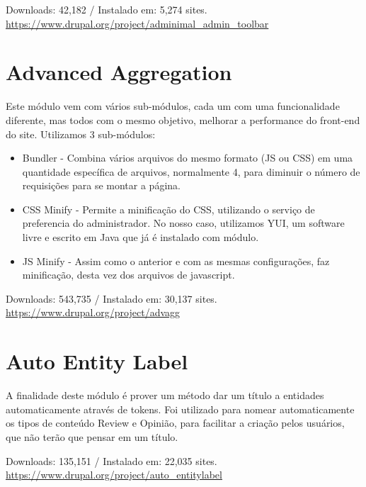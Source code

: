 \begin{center}
  Downloads: 42,182 / Instalado em: 5,274 sites.
  \url{https://www.drupal.org/project/adminimal_admin_toolbar}
\end{center}

\section{Advanced Aggregation}
Este módulo vem com vários sub-módulos, cada um com uma funcionalidade diferente, mas todos com o mesmo objetivo, melhorar a performance do front-end do site. Utilizamos 3 sub-módulos:

\begin{itemize}
  \item Bundler - Combina vários arquivos do mesmo formato (JS ou CSS) em uma quantidade específica de arquivos, normalmente 4, para diminuir o número de requisições para se montar a página.
  \item CSS Minify - Permite a minificação do CSS, utilizando o serviço de preferencia do administrador. No nosso caso, utilizamos YUI, um software livre e escrito em Java que já é instalado com módulo.
  \item JS Minify - Assim como o anterior e com as mesmas configurações, faz minificação, desta vez dos arquivos de javascript.
\end{itemize}

\begin{center}
  Downloads: 543,735 / Instalado em: 30,137 sites.
  \url{https://www.drupal.org/project/advagg}
\end{center}

\section{Auto Entity Label}
A finalidade deste módulo é prover um método dar um título a entidades automaticamente através de tokens. Foi utilizado para nomear automaticamente os tipos de conteúdo Review e Opinião, para facilitar a criação pelos usuários, que não terão que pensar em um título.

\begin{center}
  Downloads: 135,151 / Instalado em: 22,035 sites.
  \url{https://www.drupal.org/project/auto_entitylabel}
\end{center}

